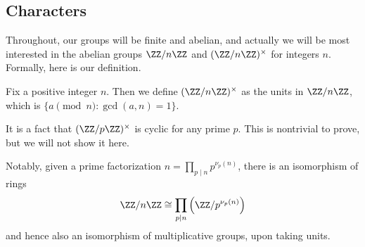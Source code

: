 \documentclass[../notes.tex]{subfiles}
\begin{document}
\subsection{Characters}
Throughout, our groups will be finite and abelian, and actually we will be most interested in the abelian groups $\ZZ/n\ZZ$ and $(\ZZ/n\ZZ)^\times$ for integers $n$. Formally, here is our definition.
\begin{definition}
	Fix a positive integer $n$. Then we define $(\ZZ/n\ZZ)^\times$ as the units in $\ZZ/n\ZZ$, which is $\{a\pmod n:\gcd(a,n)=1\}$.
\end{definition}
\begin{remark}
	It is a fact that $(\ZZ/p\ZZ)^\times$ is cyclic for any prime $p$. This is nontrivial to prove, but we will not show it here.
\end{remark}
Notably, given a prime factorization $n=\prod_{p\mid n}p^{\nu_p(n)}$, there is an isomorphism of rings
\[\ZZ/n\ZZ\cong\prod_{p\mid n}\left(\ZZ/p^{\nu_p(n)}\right)\]
and hence also an isomorphism of multiplicative groups, upon taking units.
\end{document}
